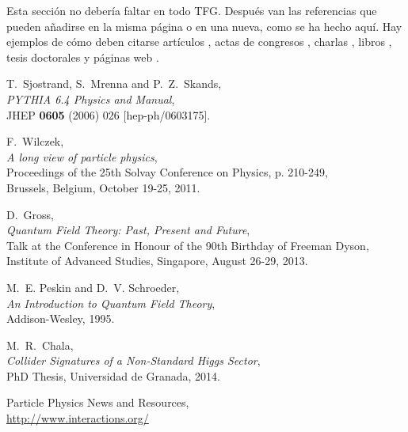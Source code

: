 \documentclass[11pt,a4paper,twoside,pdf]{article}
\numberwithin{equation}{section}
\begin{document}
Esta sección no debería faltar en todo TFG. Después van las referencias que pueden añadirse en la misma página o en una nueva, como se ha hecho aquí. Hay ejemplos de cómo deben citarse artículos \cite{PYTHIA}, actas de congresos \cite{conferencia}, charlas \cite{charla}, libros \cite{libro}, tesis doctorales \cite{tesis} y páginas web \cite{web}.



\begin{thebibliography}{100}

  T.~Sjostrand, S.~Mrenna and P.~Z.~Skands, \\
  {\em PYTHIA 6.4 Physics and Manual}, \\
  JHEP {\bf 0605} (2006) 026  [hep-ph/0603175].
  
  F.~Wilczek, \\
  {\em A long view of particle physics}, \\
  Proceedings of the 25th Solvay Conference on Physics, p. 210-249, \\  
  Brussels, Belgium, October 19-25, 2011.

  D.~Gross, \\
  {\em Quantum Field Theory: Past, Present and Future}, \\
  Talk at the Conference in Honour of the 90th Birthday of Freeman Dyson, \\
  Institute of Advanced Studies, Singapore, August 26-29, 2013.

  M.~E. Peskin and D.~V. Schroeder, \\
  {\em An Introduction to Quantum Field Theory}, \\
  Addison-Wesley, 1995.
  
  M.~R.~Chala, \\
  {\em Collider Signatures of a Non-Standard Higgs Sector}, \\
  PhD Thesis, Universidad de Granada, 2014.

 Particle Physics News and Resources, \\
 \href{http://www.interactions.org/}{http://www.interactions.org/}
 
\end{thebibliography}
\end{document}
